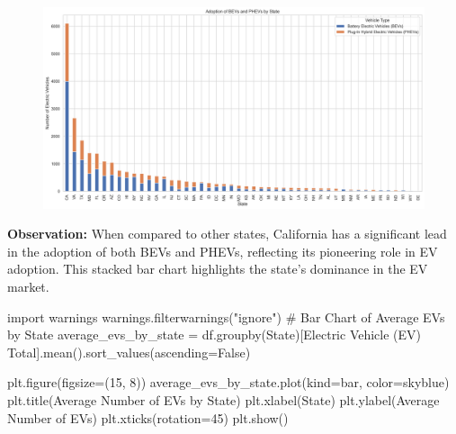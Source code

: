 \documentclass[
  letterpaper,
  DIV=11,
  numbers=noendperiod]{scrartcl}
\newenvironment{Shaded}{\begin{snugshade}}{\end{snugshade}}
\newcommand{\CommentTok}[1]{\textcolor[rgb]{0.37,0.37,0.37}{#1}}
\newcommand{\DecValTok}[1]{\textcolor[rgb]{0.68,0.00,0.00}{#1}}
\newcommand{\ImportTok}[1]{\textcolor[rgb]{0.00,0.46,0.62}{#1}}
\newcommand{\NormalTok}[1]{\textcolor[rgb]{0.00,0.23,0.31}{#1}}
\newcommand{\OperatorTok}[1]{\textcolor[rgb]{0.37,0.37,0.37}{#1}}
\newcommand{\StringTok}[1]{\textcolor[rgb]{0.13,0.47,0.30}{#1}}
\newcommand{\VariableTok}[1]{\textcolor[rgb]{0.07,0.07,0.07}{#1}}
\begin{document}
\begin{figure}[H]

{\centering \includegraphics{SummaryPaper_FinalProject_T1_files/figure-pdf/cell-15-output-1.png}

}

\end{figure}

\textbf{Observation:} When compared to other states, California has a
significant lead in the adoption of both BEVs and PHEVs, reflecting its
pioneering role in EV adoption. This stacked bar chart highlights the
state's dominance in the EV market.

\begin{Shaded}
\begin{Highlighting}[]
\ImportTok{import}\NormalTok{ warnings}
\NormalTok{warnings.filterwarnings(}\StringTok{"ignore"}\NormalTok{)}
\CommentTok{\# Bar Chart of Average EVs by State}
\NormalTok{average\_evs\_by\_state }\OperatorTok{=}\NormalTok{ df.groupby(}\StringTok{\textquotesingle{}State\textquotesingle{}}\NormalTok{)[}\StringTok{\textquotesingle{}Electric Vehicle (EV) Total\textquotesingle{}}\NormalTok{].mean().sort\_values(ascending}\OperatorTok{=}\VariableTok{False}\NormalTok{)}

\NormalTok{plt.figure(figsize}\OperatorTok{=}\NormalTok{(}\DecValTok{15}\NormalTok{, }\DecValTok{8}\NormalTok{))}
\NormalTok{average\_evs\_by\_state.plot(kind}\OperatorTok{=}\StringTok{\textquotesingle{}bar\textquotesingle{}}\NormalTok{, color}\OperatorTok{=}\StringTok{\textquotesingle{}skyblue\textquotesingle{}}\NormalTok{)}
\NormalTok{plt.title(}\StringTok{\textquotesingle{}Average Number of EVs by State\textquotesingle{}}\NormalTok{)}
\NormalTok{plt.xlabel(}\StringTok{\textquotesingle{}State\textquotesingle{}}\NormalTok{)}
\NormalTok{plt.ylabel(}\StringTok{\textquotesingle{}Average Number of EVs\textquotesingle{}}\NormalTok{)}
\NormalTok{plt.xticks(rotation}\OperatorTok{=}\DecValTok{45}\NormalTok{)}
\NormalTok{plt.show()}
\end{Highlighting}
\end{Shaded}
\end{document}
